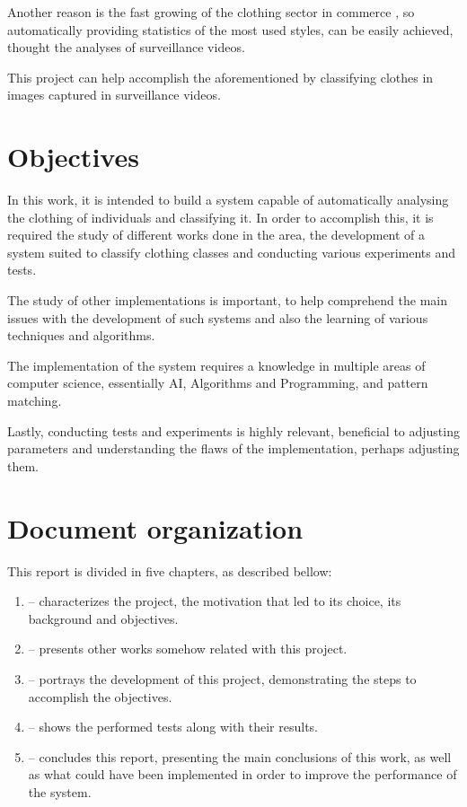 \documentclass[titlepage,12pt,a4paper,times]{book}
\begin{document}
Another reason is the fast growing of the clothing sector in commerce
\citep{5}, so automatically providing statistics of the most used styles, can
be easily achieved, thought the analyses of surveillance videos.

This project can help accomplish the aforementioned by classifying clothes in
images captured in surveillance videos.

\section{Objectives}
\label{sec:obj}

In this work, it is intended to build a system capable of automatically
analysing the clothing of individuals and classifying it. In order to
accomplish this, it is required the study of different works done in the area,
the development of a system suited to classify clothing classes and conducting
various experiments and tests.

The study of other implementations is important, to help comprehend the main
issues with the development of such systems and also the learning of various
techniques and algorithms.

The implementation of the system requires a knowledge in multiple areas of
computer science, essentially \ac{AI}, Algorithms and Programming, and pattern
matching.

Lastly, conducting tests and experiments is highly relevant, beneficial to
adjusting parameters and understanding the flaws of the implementation, perhaps
adjusting them.

\section{Document organization}
\label{sec:organ}

This report is divided in five chapters, as described bellow:
\begin{enumerate}
	\item \textbf{} -- characterizes the project, the
		motivation that led to its choice, its background and objectives.
	\item \textbf{} -- presents other works somehow related
		with this project.
	\item \textbf{} -- portrays the development of this
		project, demonstrating the steps to accomplish the objectives.
	\item \textbf{} -- shows the performed tests along with
		their results.
	\item \textbf{} -- concludes this report, presenting the
		main conclusions of this work, as well as what could have been
		implemented in order to improve the performance of the system.
\end{enumerate}
\end{document}
